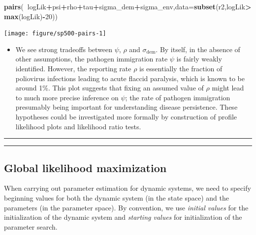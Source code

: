 \documentclass[]{article}
\newenvironment{Shaded}{\begin{snugshade}}{\end{snugshade}}
\newcommand{\KeywordTok}[1]{\textcolor[rgb]{0.13,0.29,0.53}{\textbf{#1}}}
\newcommand{\DataTypeTok}[1]{\textcolor[rgb]{0.13,0.29,0.53}{#1}}
\newcommand{\DecValTok}[1]{\textcolor[rgb]{0.00,0.00,0.81}{#1}}
\newcommand{\OperatorTok}[1]{\textcolor[rgb]{0.81,0.36,0.00}{\textbf{#1}}}
\newcommand{\NormalTok}[1]{#1}
\providecommand{\tightlist}{%
  \setlength{\itemsep}{0pt}\setlength{\parskip}{0pt}}
\begin{document}
\begin{Shaded}
\begin{Highlighting}[]
\KeywordTok{pairs}\NormalTok{(}\OperatorTok{~}\NormalTok{logLik}\OperatorTok{+}\NormalTok{psi}\OperatorTok{+}\NormalTok{rho}\OperatorTok{+}\NormalTok{tau}\OperatorTok{+}\NormalTok{sigma_dem}\OperatorTok{+}\NormalTok{sigma_env,}\DataTypeTok{data=}\KeywordTok{subset}\NormalTok{(r2,logLik}\OperatorTok{>}\KeywordTok{max}\NormalTok{(logLik)}\OperatorTok{-}\DecValTok{20}\NormalTok{))}
\end{Highlighting}
\end{Shaded}

\begin{center}\texttt{[image: figure/sp500-pairs-1]} \end{center}

\begin{itemize}
\tightlist
\item
  We see strong tradeoffs between \(\psi\), \(\rho\) and
  \(\sigma_\mathrm{dem}\). By itself, in the absence of other
  assumptions, the pathogen immigration rate \(\psi\) is fairly weakly
  identified. However, the reporting rate \(\rho\) is essentially the
  fraction of poliovirus infections leading to acute flaccid paralysis,
  which is known to be around 1\%. This plot suggests that fixing an
  assumed value of \(\rho\) might lead to much more precise inference on
  \(\psi\); the rate of pathogen immigration presumably being important
  for understanding disease persistence. These hypotheses could be
  investigated more formally by construction of profile likelihood plots
  and likelihood ratio tests.
\end{itemize}

\begin{center}\rule{0.5\linewidth}{\linethickness}\end{center}

\begin{center}\rule{0.5\linewidth}{\linethickness}\end{center}

\subsection{Global likelihood
maximization}\label{global-likelihood-maximization}

When carrying out parameter estimation for dynamic systems, we need to
specify beginning values for both the dynamic system (in the state
space) and the parameters (in the parameter space). By convention, we
use \emph{initial values} for the initialization of the dynamic system
and \emph{starting values} for initialization of the parameter search.
\end{document}
